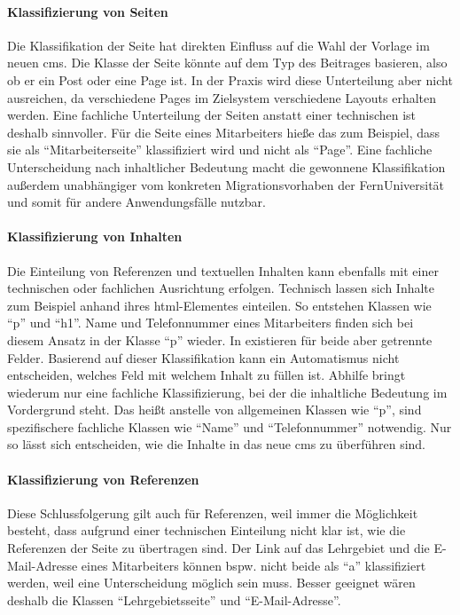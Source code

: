         \paragraph{Klassifizierung von Seiten}
        Die Klassifikation der Seite hat direkten Einfluss auf die Wahl der Vorlage im neuen \gls{cms}.
        Die Klasse der Seite könnte auf dem Typ des Beitrages basieren,
        also ob er ein Post oder eine Page ist.
        In der Praxis wird diese Unterteilung aber nicht ausreichen,
        da verschiedene {\wordpress} Pages im Zielsystem verschiedene Layouts erhalten werden.
        Eine fachliche Unterteilung der Seiten anstatt einer technischen ist deshalb sinnvoller.
        Für die Seite eines Mitarbeiters hieße das zum Beispiel,
        dass sie als "`Mitarbeiterseite"' klassifiziert wird und nicht als "`Page"'.
        Eine fachliche Unterscheidung nach inhaltlicher Bedeutung macht die
        gewonnene Klassifikation außerdem unabhängiger vom konkreten
        Migrationsvorhaben der FernUniversität und somit für andere Anwendungsfälle nutzbar.

        \paragraph{Klassifizierung von Inhalten}
        Die Einteilung von Referenzen und textuellen Inhalten kann ebenfalls
        mit einer technischen oder fachlichen Ausrichtung erfolgen.
        Technisch lassen sich Inhalte zum Beispiel anhand ihres \gls{html}-Elementes einteilen.
        So entstehen Klassen wie "`p"' und "`h1"'.
        Name und Telefonnummer eines Mitarbeiters finden sich bei diesem Ansatz in der Klasse "`p"' wieder.
        In {\imperia} existieren für beide aber getrennte Felder.
        Basierend auf dieser Klassifikation kann ein Automatismus
        nicht entscheiden, welches Feld mit welchem Inhalt zu füllen ist.
        Abhilfe bringt wiederum nur eine fachliche Klassifizierung,
        bei der die inhaltliche Bedeutung im Vordergrund steht.
        Das heißt anstelle von allgemeinen Klassen wie "`p"',
        sind spezifischere fachliche Klassen wie
        "`Name"' und "`Telefonnummer"' notwendig.
        Nur so lässt sich entscheiden, wie die Inhalte in das neue \gls{cms}
        zu überführen sind.

        \paragraph{Klassifizierung von Referenzen}
        Diese Schlussfolgerung gilt auch für Referenzen,
        weil immer die Möglichkeit besteht,
        dass aufgrund einer technischen Einteilung nicht klar ist,
        wie die Referenzen der Seite zu übertragen sind.
        Der Link auf das Lehrgebiet und die E-Mail-Adresse eines Mitarbeiters
        können bspw. nicht beide als "`a"' klassifiziert werden,
        weil eine Unterscheidung möglich sein muss.
        Besser geeignet wären deshalb die Klassen "`Lehrgebietsseite"'
        und "`E-Mail-Adresse"'.

